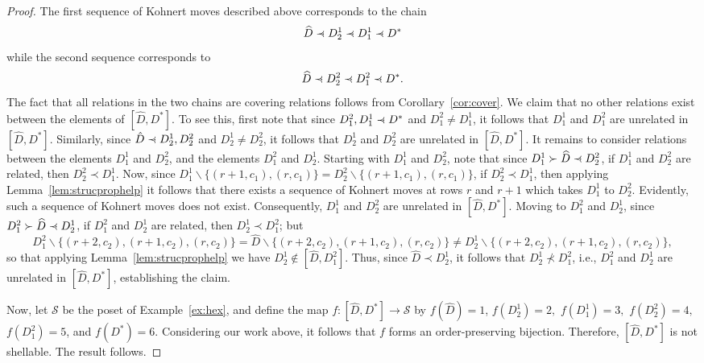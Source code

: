 \documentclass[letterpaper,10pt]{article}
\newcommand{\precdot}{\prec\mathrel{\mkern-5mu}\mathrel{\cdot}}
\begin{document}
\begin{proof}
The first sequence of Kohnert moves described above corresponds to the chain $$\widehat{D}\precdot D^1_2\precdot D^1_1 \precdot D^*$$ while the second sequence corresponds to $$\widehat{D}\precdot D^2_2\precdot D^2_1 \precdot D^*.$$ The fact that all relations in the two chains are covering relations follows from Corollary~\ref{cor:cover}. We claim that no other relations exist between the elements of $[\widehat{D},D^*]$. To see this, first note that since $D_1^2,D_1^1\precdot D^*$ and $D_1^2\neq D_1^1$, it follows that $D_1^1$ and $D_1^2$ are unrelated in $[\widehat{D},D^*]$. Similarly, since $\hat{D}\precdot D_2^1,D_2^2$ and $D_2^1\neq D_2^2$, it follows that $D_2^1$ and $D_2^2$ are unrelated in $[\widehat{D},D^*]$. It remains to consider relations between the elements $D_1^1$ and $D_2^2$, and the elements $D_1^2$ and $D_2^1$. Starting with $D_1^1$ and $D_2^2$, note that since $D_1^1\succ\widehat{D}\precdot D_2^2$, if $D_1^1$ and $D_2^2$ are related, then $D_2^2\prec D_1^1$. Now, since $D_1^1\backslash\{(r+1,c_1),(r,c_1)\}=D_2^2\backslash\{(r+1,c_1),(r,c_1)\}$, if $D_2^2\prec D_1^1$, then applying Lemma~\ref{lem:strucprophelp} it follows that there exists a sequence of Kohnert moves at rows $r$ and $r+1$ which takes $D_1^1$ to $D_2^2$. Evidently, such a sequence of Kohnert moves does not exist. Consequently, $D_1^1$ and $D_2^2$ are unrelated in $[\widehat{D},D^*]$. Moving to $D_1^2$ and $D_2^1$, since $D_1^2\succ \widehat{D}\precdot D_2^1$, if $D_1^2$ and $D_2^1$ are related, then $D_2^1\prec D_1^2$; but $$D_1^2\backslash \{(r+2,c_2),(r+1,c_2),(r,c_2)\}=\widehat{D}\backslash \{(r+2,c_2),(r+1,c_2),(r,c_2)\}\neq D_2^1\backslash \{(r+2,c_2),(r+1,c_2),(r,c_2)\},$$ so that applying Lemma~\ref{lem:strucprophelp} we have $D_2^1\notin [\widehat{D},D_1^2]$. Thus, since $\widehat{D}\prec D_2^1$, it follows that $D_2^1\not\prec D_1^2$, i.e., $D_1^2$ and $D_2^1$ are unrelated in $[\widehat{D},D^*]$, establishing the claim.

Now, let $\mathcal{S}$ be the poset of Example~\ref{ex:hex}, and define the map  $f:[\widehat{D},D^*]\to\mathcal{S}$ by $f(\widehat{D})=1$, $f(D^1_2)=2,$ $f(D^1_1)=3,$ $f(D^2_2)=4,$ $f(D_1^2)=5$, and $f(D^*)=6$. Considering our work above, it follows that $f$ forms an order-preserving bijection. Therefore, $[\widehat{D},D^*]$ is not shellable. The result follows.
\end{proof}
\end{document}
